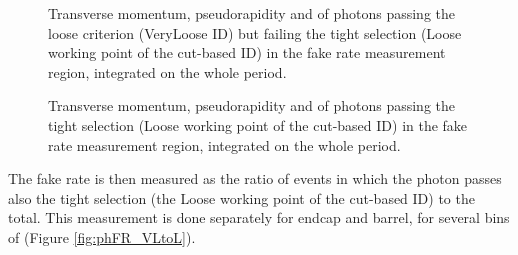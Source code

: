 \begin{figure}
  \centering
  \caption{Transverse momentum, pseudorapidity and \sieie of photons
    passing the loose criterion (VeryLoose ID) but failing the tight selection (Loose working point of the cut-based ID)
    in the fake rate measurement region, integrated on the whole  period.}
  \label{fig:CRLFR_lead_fail}
\end{figure}

\begin{figure}
  \centering
  \caption{Transverse momentum, pseudorapidity and \sieie of photons
    passing the tight selection (Loose working point of the cut-based ID)
    in the fake rate measurement region, integrated on the whole  period.}
  \label{fig:CRLFR_lead_pass}
\end{figure}

The fake rate is then measured as the ratio of events in which the photon passes also the tight selection (the Loose working point of the cut-based ID)
to the total.
This measurement is done separately for endcap and barrel, for several bins of \pt (Figure \ref{fig:phFR_VLtoL}).

